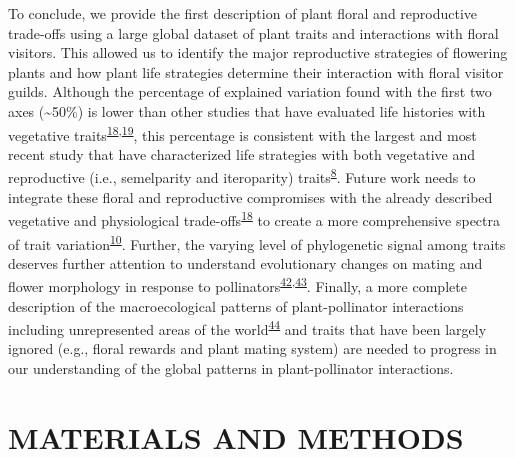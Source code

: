 \documentclass[12pt,a4paper,]{article}
\begin{document}
To conclude, we provide the first description of plant floral and
reproductive trade-offs using a large global dataset of plant traits and
interactions with floral visitors. This allowed us to identify the major
reproductive strategies of flowering plants and how plant life
strategies determine their interaction with floral visitor guilds.
Although the percentage of explained variation found with the first two
axes (\textasciitilde{}50\%) is lower than other studies that have
evaluated life histories with vegetative
traits\textsuperscript{\protect\hyperlink{ref-diaz2016}{18},\protect\hyperlink{ref-carmona2021}{19}},
this percentage is consistent with the largest and most recent study
that have characterized life strategies with both vegetative and
reproductive (i.e., semelparity and iteroparity)
traits\textsuperscript{\protect\hyperlink{ref-salguero2016}{8}}. Future
work needs to integrate these floral and reproductive compromises with
the already described vegetative and physiological
trade-offs\textsuperscript{\protect\hyperlink{ref-diaz2016}{18}} to
create a more comprehensive spectra of trait
variation\textsuperscript{\protect\hyperlink{ref-roddy2021}{10}}.
Further, the varying level of phylogenetic signal among traits deserves
further attention to understand evolutionary changes on mating and
flower morphology in response to
pollinators\textsuperscript{\protect\hyperlink{ref-gervasi2017}{42},\protect\hyperlink{ref-mackin2021}{43}}.
Finally, a more complete description of the macroecological patterns of
plant-pollinator interactions including unrepresented areas of the
world\textsuperscript{\protect\hyperlink{ref-poisot2021}{44}} and traits
that have been largely ignored (e.g., floral rewards and plant mating
system) are needed to progress in our understanding of the global
patterns in plant-pollinator interactions.

\section{MATERIALS AND METHODS}\label{materials-and-methods}
\end{document}
